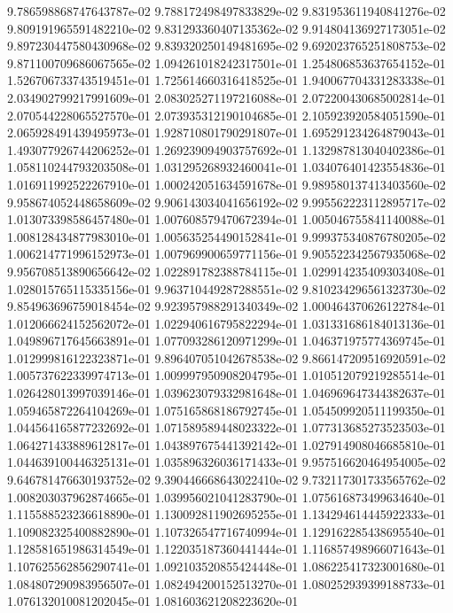 9.786598868747643787e-02
9.788172498497833829e-02
9.831953611940841276e-02
9.809191965591482210e-02
9.831293360407135362e-02
9.914804136927173051e-02
9.897230447580430968e-02
9.839320250149481695e-02
9.692023765251808753e-02
9.871100709686067565e-02
1.094261018242317501e-01
1.254806853637654152e-01
1.526706733743519451e-01
1.725614660316418525e-01
1.940067704331283338e-01
2.034902799217991609e-01
2.083025271197216088e-01
2.072200430685002814e-01
2.070544228065527570e-01
2.073935312190104685e-01
2.105923920584051590e-01
2.065928491439495973e-01
1.928710801790291807e-01
1.695291234264879043e-01
1.493077926744206252e-01
1.269239094903757692e-01
1.132987813040402386e-01
1.058110244793203508e-01
1.031295268932460041e-01
1.034076401423554836e-01
1.016911992522267910e-01
1.000242051634591678e-01
9.989580137413403560e-02
9.958674052448658609e-02
9.906143034041656192e-02
9.995562223112895717e-02
1.013073398586457480e-01
1.007608579470672394e-01
1.005046755841140088e-01
1.008128434877983010e-01
1.005635254490152841e-01
9.999375340876780205e-02
1.006214771996152973e-01
1.007969900659771156e-01
9.905522342567935068e-02
9.956708513890656642e-02
1.022891782388784115e-01
1.029914235409303408e-01
1.028015765115335156e-01
9.963710449287288551e-02
9.810234296561323730e-02
9.854963696759018454e-02
9.923957988291340349e-02
1.000464370626122784e-01
1.012066624152562072e-01
1.022940616795822294e-01
1.031331686184013136e-01
1.049896717645663891e-01
1.077093286120971299e-01
1.046371975774369745e-01
1.012999816122323871e-01
9.896407051042678538e-02
9.866147209516920591e-02
1.005737622339974713e-01
1.009997950908204795e-01
1.010512079219285514e-01
1.026428013997039146e-01
1.039623079332981648e-01
1.046969647344382637e-01
1.059465872264104269e-01
1.075165868186792745e-01
1.054509920511199350e-01
1.044564165877232692e-01
1.071589589448023322e-01
1.077313685273523503e-01
1.064271433889612817e-01
1.043897675441392142e-01
1.027914908046685810e-01
1.044639100446325131e-01
1.035896326036171433e-01
9.957516620464954005e-02
9.646781476630193752e-02
9.390446668643022410e-02
9.732117301733565762e-02
1.008203037962874665e-01
1.039956021041283790e-01
1.075616873499634640e-01
1.115588523236618890e-01
1.130092811902695255e-01
1.134294614445922333e-01
1.109082325400882890e-01
1.107326547716740994e-01
1.129162285438695540e-01
1.128581651986314549e-01
1.122035187360441444e-01
1.116857498966071643e-01
1.107625562856290741e-01
1.092103520855424448e-01
1.086225417323001680e-01
1.084807290983956507e-01
1.082494200152513270e-01
1.080252939399188733e-01
1.076132010081202045e-01
1.081603621208223620e-01
